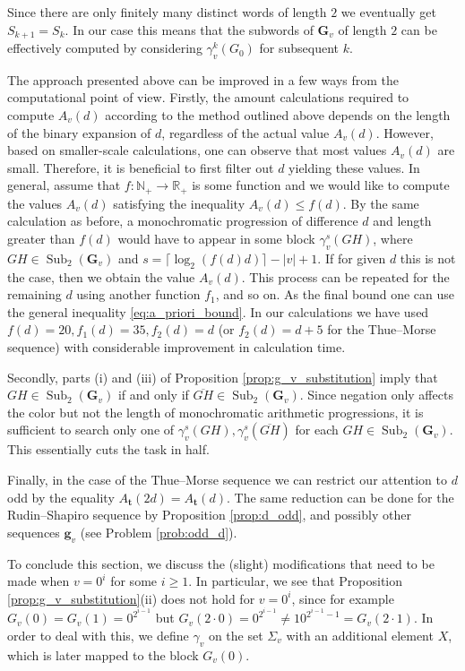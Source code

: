 \documentclass[a4paper,11pt]{amsart}
\theoremstyle{definition}
\newcommand{\R}{\mathbb{R}}
\newcommand{\N}{\mathbb{N}}
\newcommand{\Sub}{\operatorname{Sub}}
\begin{document}
Since there are only finitely many distinct words of length $2$ we eventually get $S_{k+1} = S_k$. 
In our case this means that the subwords of $\mathbf{G}_v$ of length $2$ can be effectively computed by considering $\gamma_v^k(G_0)$ for subsequent $k$.

The approach presented above can be improved in a few ways from the computational point of view. Firstly, the amount calculations required to compute $A_v(d)$ according to the method outlined above depends on the length of the binary expansion of $d$, regardless of the actual value $A_v(d)$. However, based on smaller-scale calculations, one can observe that most values $A_v(d)$ are small. Therefore, it is beneficial to first filter out $d$ yielding these values. In general, assume that $f \colon \N_+ \to \R_{+}$ is some function and we would like to compute the values $A_v(d)$ satisfying the inequality $A_v(d) \leq f(d)$. By the same calculation as before, a monochromatic progression of difference $d$ and length greater than $f(d)$ would have to appear in some block $\gamma_v^s(GH)$, where $GH \in \Sub_2(\mathbf{G}_v)$ and $s = \lceil \log_2 (f(d)d) \rceil - |v| + 1$. If for given $d$ this is not the case, then we obtain the value $A_v(d)$. This process can be repeated for the remaining $d$ using another function $f_1$, and so on. As the final bound one can use the general inequality \eqref{eq:a_priori_bound}. In our calculations we have used $f(d) = 20, f_1(d)=35, f_2(d) = d$ (or $f_2(d)=d+5$ for the Thue--Morse sequence) with considerable improvement in calculation time. 

Secondly, parts (i) and (iii) of Proposition \ref{prop:g_v_substitution} imply that $GH \in \Sub_2(\mathbf{G}_v)$ if and only if $\overline{GH} \in \Sub_2(\mathbf{G}_v)$. Since negation only affects the color but not the length of monochromatic arithmetic progressions, it is sufficient to search only one of $\gamma_v^s(GH), \gamma_v^s(\overline{GH})$ for each $GH \in \Sub_2(\mathbf{G}_v)$. This essentially cuts the task in half.

Finally, in the case of the Thue--Morse sequence we can restrict our attention to $d$ odd by the equality $A_{\mathbf{t}}(2d) = A_{\mathbf{t}}(d)$. The same reduction can be done for the Rudin--Shapiro sequence by Proposition \ref{prop:d_odd}, and possibly other sequences $\mathbf{g}_v$ (see Problem \ref{prob:odd_d}).
 
To conclude this section, we discuss the (slight) modifications that need to be made when $v=0^i$ for some $i \geq 1$. In particular, we see that Proposition \ref{prop:g_v_substitution}(ii) does not hold for $v=0^i$, since for example $G_v(0) = G_v(1) = 0^{2^{i-1}}$ but $G_v(2 \cdot 0) = 0^{2^{i-1}} \neq 10^{2^{i-1}-1} = G_v(2\cdot 1)$. In order to deal with this, we define $\gamma_v$ on the set $\Sigma_v$ with an additional element $X$, which is later mapped to the block $G_v(0)$.
\end{document}
